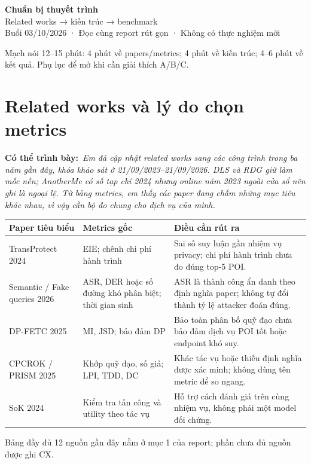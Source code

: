 \documentclass[10pt,a4paper]{article}
\newcommand{\key}[1]{\par\smallskip\noindent\colorbox{pale}{\parbox{\dimexpr\linewidth-2\fboxsep}{#1}}\par\smallskip}
\newcommand{\say}[1]{\par\textbf{Có thể trình bày:}\ \textit{#1}\par}
\begin{document}
\begin{center}
{\LARGE\bfseries\color{ink}Chuẩn bị thuyết trình}\\[5pt]
{\large Related works → kiến trúc → benchmark}\\[3pt]
{\small Buổi 03/10/2026 · Đọc cùng report rút gọn · Không có thực nghiệm mới}
\end{center}
\key{Mạch nói 12–15 phút: 4 phút về papers/metrics; 4 phút về kiến trúc; 4–6 phút về kết quả. Phụ lục để mở khi cần giải thích A/B/C.}

\section{Related works và lý do chọn metrics}
\say{Em đã cập nhật related works sang các công trình trong ba năm gần đây, khóa khảo sát ở 21/09/2023–21/09/2026. DLS và RDG giữ làm mốc nền; AnotherMe có số tạp chí 2024 nhưng online năm 2023 ngoài cửa sổ nên ghi là ngoại lệ. Từ bảng metrics, em thấy các paper đang chấm những mục tiêu khác nhau, vì vậy cần bộ đo chung cho dịch vụ của mình.}

\begin{longtable}{@{}P{4.1cm}P{5.4cm}P{6.1cm}@{}}
\toprule Paper tiêu biểu & Metrics gốc & Điều cần rút ra\\\midrule
TransProtect 2024 & EIE; chênh chi phí hành trình & Sai số suy luận gần nhiệm vụ privacy; chi phí hành trình chưa đo đúng top-5 POI.\\
Semantic / Fake queries 2026 & ASR, DER hoặc số đường khó phân biệt; thời gian sinh & ASR là thành công ẩn danh theo định nghĩa paper; không tự đổi thành tỷ lệ attacker đoán đúng.\\
DP-FETC 2025 & MI, JSD; bảo đảm DP & Bảo toàn phân bố quỹ đạo chưa bảo đảm dịch vụ POI tốt hoặc endpoint khó suy.\\
CPCROK / PRISM 2025 & Khớp quỹ đạo, số giả; LPI, TDD, DC & Khác tác vụ hoặc thiếu định nghĩa được xác minh; không dùng tên metric để so ngang.\\
SoK 2024 & Kiểm tra tấn công và utility theo tác vụ & Hỗ trợ cách đánh giá trên cùng nhiệm vụ, không phải một model đối chứng.\\
\bottomrule
\end{longtable}
Bảng đầy đủ 12 nguồn gần đây nằm ở mục 1 của report; phần chưa đủ nguồn được ghi CX.
\end{document}
